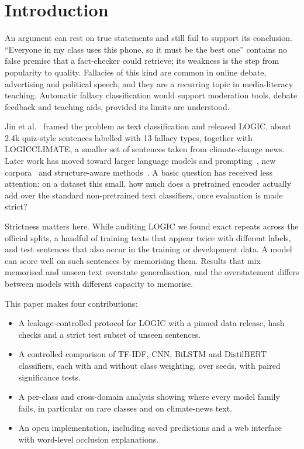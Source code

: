 \documentclass[conference]{IEEEtran}
\begin{document}
\section{Introduction}
An argument can rest on true statements and still fail to support its conclusion. ``Everyone in my class uses this phone, so it must be the best one'' contains no false premise that a fact-checker could retrieve; its weakness is the step from popularity to quality. Fallacies of this kind are common in online debate, advertising and political speech, and they are a recurring topic in media-literacy teaching. Automatic fallacy classification would support moderation tools, debate feedback and teaching aids, provided its limits are understood.

Jin et al.~\cite{jin2022logical} framed the problem as text classification and released LOGIC, about 2.4k quiz-style sentences labelled with 13 fallacy types, together with LOGICCLIMATE, a smaller set of sentences taken from climate-change news. Later work has moved toward larger language models and prompting~\cite{lei2024logicaltree,pan2024zeroshot}, new corpora~\cite{helwe2024mafalda,yeh2024cocolofa} and structure-aware methods~\cite{goffredo2022political}. A basic question has received less attention: on a dataset this small, how much does a pretrained encoder actually add over the standard non-pretrained text classifiers, once evaluation is made strict?

Strictness matters here. While auditing LOGIC we found exact repeats across the official splits, a handful of training texts that appear twice with different labels, and test sentences that also occur in the training or development data. A model can score well on such sentences by memorising them. Results that mix memorised and unseen text overstate generalisation, and the overstatement differs between models with different capacity to memorise.

This paper makes four contributions:
\begin{itemize}
\item A leakage-controlled protocol for LOGIC with a pinned data release, hash checks and a strict test subset of \nStrict{} unseen sentences.
\item A controlled comparison of TF-IDF, CNN, BiLSTM and DistilBERT classifiers, each with and without class weighting, over \nSeeds{} seeds, with paired significance tests.
\item A per-class and cross-domain analysis showing where every model family fails, in particular on rare classes and on climate-news text.
\item An open implementation, including saved predictions and a web interface with word-level occlusion explanations.
\end{itemize}
\end{document}
